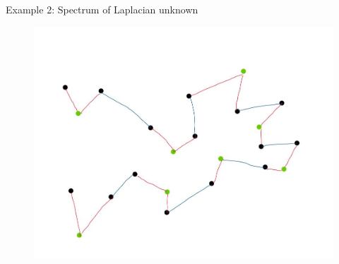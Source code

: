 \documentclass{beamer}
\begin{document}
\begin{frame}{Example 2: Spectrum of Laplacian unknown}
\begin{figure}[]
\begin{overprint}
			\includegraphics[scale=0.65]{figures/graph_example_5.jpg}	
		\end{overprint}	
\end{figure}
\end{frame}
\end{document}
